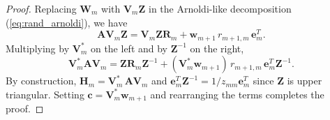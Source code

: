 \documentclass[10pt,a4paper]{amsart}
\newcommand{\mat}[1]{\mathbf{#1}}
\renewcommand{\vec}[1]{\mathbf{#1}}
\begin{document}
\begin{proof}
   Replacing $\mat{W}_m$ with $\mat{V}_m \mat{Z}$ in the Arnoldi-like decomposition (\ref{eq:rand_arnoldi}), we have
   \begin{equation*}
     \mat{A} \mat{V}_m \mat{Z} = \mat{V}_m \mat{Z} \mat{R}_m + \vec{w}_{m + 1} \, r_{m + 1, m} \, \vec{e}^T_m.
   \end{equation*}
   Multiplying by $\mat{V}_m^*$ on the left and by $\mat{Z}^{-1}$ on the right,
      \begin{equation*}
     \mat{V}_m^* \mat{A} \mat{V}_m =  \mat{Z} \mat{R}_m \mat{Z}^{-1} + (\mat{V}_m^* \vec{w}_{m + 1}) \, r_{m + 1, m} \, \vec{e}^T_m \mat{Z}^{-1}.
   \end{equation*}
   By construction, $\mat{H}_m = \mat{V}_m^* \, \mat{A} \mat{V}_m$ and $\vec{e}_m^T \mat{Z}^{-1} = 1 / z_{mm} \vec{e}_m^T$ since $\mat{Z}$ is upper triangular. Setting $\vec{c} = \mat{V}_m^* \vec{w}_{m + 1}$ and rearranging the terms completes the proof.
\end{proof}
\end{document}
